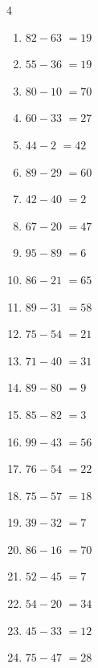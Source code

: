 \begin{multicols}{4}
\begin{enumerate}
  \item $82-63$
        $=19$

  \item $55-36$
        $=19$

  \item $80-10$
        $=70$

  \item $60-33$
        $=27$

  \item $44-2$
        $=42$

  \item $89-29$
        $=60$

  \item $42-40$
        $=2$

  \item $67-20$
        $=47$

  \item $95-89$
        $=6$

  \item $86-21$
        $=65$

  \item $89-31$
        $=58$

  \item $75-54$
        $=21$

  \item $71-40$
        $=31$

  \item $89-80$
        $=9$

  \item $85-82$
        $=3$

  \item $99-43$
        $=56$

  \item $76-54$
        $=22$

  \item $75-57$
        $=18$

  \item $39-32$
        $=7$

  \item $86-16$
        $=70$

  \item $52-45$
        $=7$

  \item $54-20$
        $=34$

  \item $45-33$
        $=12$

  \item $75-47$
        $=28$


\end{enumerate}
\end{multicols}
